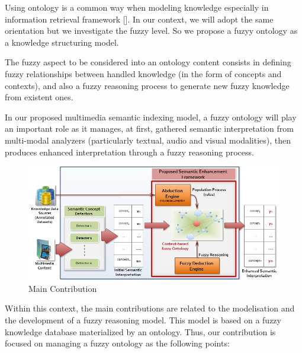 	Using ontology is a common way when modeling knowledge especially in information retrieval framework []. In our context, we will adopt the same orientation but we investigate the fuzzy level. So we propose a fuzyy ontology as a knowledge structuring model. 
	
	The fuzzy aspect to be considered into an ontology content consists in defining fuzzy relationships between handled knowledge (in the form of concepts and contexts), and also a fuzzy reasoning process to generate new fuzzy knowledge from existent ones.
	
	In our proposed multimedia semantic indexing model, a fuzzy ontology will play an important role as it manages, at first, gathered semantic interpretation from multi-modal analyzers (particularly textual, audio and visual modalities), then produces enhanced interpretation through a fuzzy reasoning process.
	
				\begin{figure}[ht!]
					\centering
					\includegraphics[width=1\textwidth]{graphics/systeme}	
					\caption{Main Contribution}
					\label{fig_intro::contribution}
				\end{figure}
	
	Within this context, the main contributions are related to the modelisation and the development of a fuzzy reasoning model. This model is based on a fuzzy knowledge database materialized by an ontology. Thus, our contribution is focused on managing a fuzzy ontology as the following points:
	
